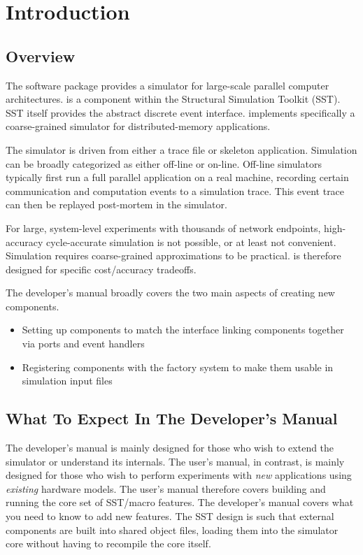 
\chapter{Introduction}\label{chapter:intro}

\section{Overview}
\label{sec:intro:overview}

The \sstmacro software package provides a simulator for large-scale parallel computer architectures.
\sstmacro is a component within the Structural Simulation Toolkit (SST).
SST itself provides the abstract discrete event interface.
\sstmacro implements specifically a coarse-grained simulator for distributed-memory applications. 

The simulator is driven from either a trace file or skeleton application. 
Simulation can be broadly categorized as either off-line or on-line.
Off-line simulators typically first run a full parallel application on a real machine,
recording certain communication and computation events to a simulation trace.
This event trace can then be replayed post-mortem in the simulator.

For large, system-level experiments with thousands of network endpoints, high-accuracy cycle-accurate simulation is not possible,
or at least not convenient.
Simulation requires coarse-grained approximations to be practical.
\sstmacro is therefore designed for specific cost/accuracy tradeoffs.

The developer's manual broadly covers the two main aspects of creating new components.
\begin{itemize}
\item Setting up components to match the  interface linking components together via ports and event handlers
\item Registering components with the factory system to make them usable in simulation input files
\end{itemize}

\section{What To Expect In The Developer's Manual}
\label{sec:whatToExpect}

The developer's manual is mainly designed for those who wish to extend the simulator or understand its internals.
The user's manual, in contrast, is mainly designed for those who wish to perform experiments with \emph{new} applications using \emph{existing} hardware models.
The user's manual therefore covers building and running the core set of SST/macro features.
The developer's manual covers what you need to know to add new features.
The SST design is such that external components are built into shared object  files,
loading them into the simulator core without having to recompile the core itself.


